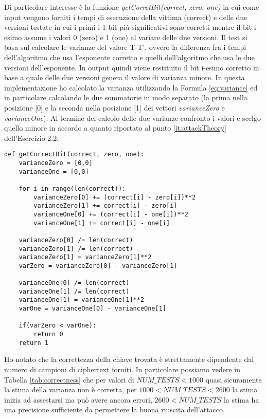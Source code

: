 \documentclass{article}
\begin{document}
Di particolare interesse è la funzione \textit{getCorretBit(correct, zero, one)} in cui come input vengono forniti i tempi di esecuzione della vittima (correct) e delle due versioni testate in cui i primi i-1 bit più significativi sono corretti mentre il bit i-esimo assume i valori 0 (zero) e 1 (one) al variare delle due versioni. Il test si basa sul calcolare le varianze del valore T-T', ovvero la differenza fra i tempi dell'algoritmo che usa l'esponente corretto e quelli dell'algoritmo che usa le due versioni dell'esponente. In output quindi viene restituito il bit i-esimo corretto in base a quale delle due versioni genera il valore di varianza minore. In questa implementazione ho calcolato la varianza utilizzando la Formula \ref{eq:variance} ed in particolare calcolando le due sommatorie in modo separato (la prima nella posizione [0] e la seconda nella posizione [1] dei vettori \textit{varianceZero} e \textit{varianceOne}). Al termine del calcolo delle due varianze confronto i valori e scelgo quello minore in accordo a quanto riportato al punto \ref{it:attackTheory} dell'Esercizio 2.2.
\begin{lstlisting}
def getCorrectBit(correct, zero, one):
    varianceZero = [0,0] 
    varianceOne = [0,0]
    
    for i in range(len(correct)):
        varianceZero[0] += (correct[i] - zero[i])**2
        varianceZero[1] += correct[i] - zero[i]
        varianceOne[0] += (correct[i] - one[i])**2
        varianceOne[1] += correct[i] - one[i]
        
    varianceZero[0] /= len(correct)
    varianceZero[1] /= len(correct)
    varianceZero[1] = varianceZero[1]**2
    varZero = varianceZero[0] - varianceZero[1]
    
    varianceOne[0] /= len(correct)
    varianceOne[1] /= len(correct)
    varianceOne[1] = varianceOne[1]**2
    varOne = varianceOne[0] - varianceOne[1]
    
    if(varZero < varOne):
        return 0
    return 1
\end{lstlisting}
Ho notato che la correttezza della chiave trovata è strettamente dipendente dal numero di campioni di ciphertext forniti. In particolare possiamo vedere in Tabella \ref{tab:correctness} che per valori di $NUM\_TESTS <1000$ quasi sicuramente la stima della varianza non è corretta, per $1000 < NUM\_TESTS < 2600$ la stima inizia ad assestarsi ma può avere ancora errori, $2600 < NUM\_TESTS$ la stima ha una precisione sufficiente da permettere la buona riuscita dell'attacco.
\end{document}

